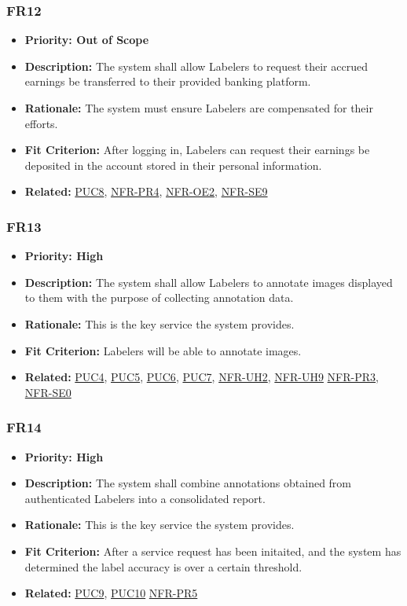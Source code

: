 \documentclass[12pt]{article}
\begin{document}
\subsubsection*{FR12}
\label{sec:FR12}
\begin{itemize}
  \item \textbf{Priority: Out of Scope}
  \item \textbf{Description:} The system shall allow Labelers to request their accrued earnings be transferred to their provided banking platform.
  \item \textbf{Rationale:} The system must ensure Labelers are compensated for their efforts.
\item \textbf{Fit Criterion:} After logging in, Labelers can request their earnings be deposited in the account stored in their personal information.
\item \textbf{Related:}  \hyperref[sec:PUC8]{PUC8}, \hyperref[sec:PR4]{NFR-PR4}, \hyperref[sec:OE2]{NFR-OE2}, \hyperref[sec:SE9]{NFR-SE9}
\end{itemize}
\subsubsection*{FR13}
\label{sec:FR13}
\begin{itemize}
  \item \textbf{Priority: High}
  \item \textbf{Description:} The system shall allow Labelers to annotate images displayed to them with the purpose of collecting annotation data.
  \item \textbf{Rationale:} This is the key service the system provides.
  \item \textbf{Fit Criterion:} Labelers will be able to annotate images.
  \item \textbf{Related:} \hyperref[sec:PUC4]{PUC4}, \hyperref[sec:PUC5]{PUC5}, \hyperref[sec:PUC6]{PUC6}, \hyperref[sec:PUC7]{PUC7}, \hyperref[sec:UH2]{NFR-UH2}, \hyperref[sec:UH9]{NFR-UH9} \hyperref[sec:PR3]{NFR-PR3}, \hyperref[sec:SE0]{NFR-SE0}
\end{itemize}
\subsubsection*{FR14}
\label{sec:FR14}
\begin{itemize}
  \item \textbf{Priority: High}
  \item \textbf{Description:} The system shall combine annotations obtained from authenticated Labelers into a consolidated report.
  \item \textbf{Rationale:} This is the key service the system provides.
  \item \textbf{Fit Criterion:} After a service request has been initaited, and the system has determined the label accuracy is over a certain threshold.
  \item \textbf{Related:} \hyperref[sec:PUC9]{PUC9}, \hyperref[sec:PUC10]{PUC10} \hyperref[sec:PR5]{NFR-PR5}
\end{itemize}
\end{document}
